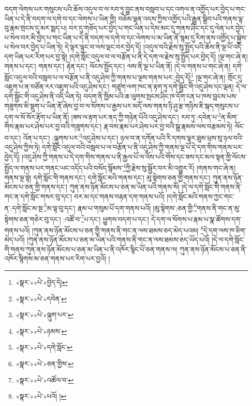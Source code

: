 བདག་ལེགས་པར་གསུངས་པའི་ཆོས་འདུལ་བ་ལ་རབ་ཏུ་བྱུང་ནས་བསླབ་པ་དང་འགལ་ན་འགྱོད་པར་བྱེད་པ་གང་ཡིན་པ་དེ་ནི་བདག་ལ་དགེ་བ་དང་ལེགས་པ་ཡིན་གྱི། བཅོམ་ལྡན་འདས་ཀྱིས་འགྱོད་པའི་རྒྱུན་སྒྲིབ་པའི་གནས་ལྟ་བུ་རྣམ་གྲངས་དུ་མར་སྨད་པ། བར་དུ་གཅོད་པར་བྱེད་པ་གང་ཡིན་པ་དེས་མང་དུ་གནས་ཤིང་དང་དུ་ལེན་པར་བྱེད་པ་སེལ་བར་མི་བྱེད་པ་གང་ཡིན་པ་དེ་ནི་བདག་ལ་དགེ་བ་དང་ལེགས་པ་མ་ཡིན་ནོ་སྙམ་དུ་རིག་ནས་འགྱོད་པ་སྐྱེས་པ་སེལ་བར་བྱེད་པ་ཡིན་ཏེ། དེ་ལྟར་ལྟུང་བ་ལས་ལྡང་བར་བྱེད་དོ། །འདུལ་བའི་རྗེས་སུ་སྤྱོད་པའི་ཆོས་ནི་ལྔ་པོ་འདི་དག་ཡིན་པར་རིག་པར་བྱ་སྟེ། །དགེ་སློང་འདུལ་བ་ལ་བརྩོན་པ་ནི་དེ་དག་ལ་རྗེས་སུ་སྤྱོད་པར་བྱེད་དོ། །ལྔ་གང་ཞེ་ན། གནས་པ་དང་། གནས་དང་། རྟེན་དང་། ལོངས་སྤྱོད་དང་། ལས་ནི་ལྔ་པ་ཡིན་ནོ། །དེ་ལ་གནས་པ་གང་ཞེ་ན། དགེ་སློང་འདུལ་བའི་བསླབ་པ་ལ་བརྩོན་པ་ནི་འདུ་ཤེས་ཀྱི་གནས་པ་ལྔས་གནས་པར་:བྱེད་དོ།\footnote{«སྣར་»«པེ་»བྱེད་དེ།} །ལྔ་གང་ཞེ་ན། གྲོང་དུ་འཇུག་པ་ན་བཙོན་རར་འཇུག་པའི་འདུ་ཤེས་དང་། གཙུག་ལག་ཁང་ན་རྟག་ཏུ་དགེ་སྦྱོང་གི་འདུ་ཤེས་དང་ལྡན། དེ་ལ་དགེ་སྦྱོང་གི་འདུ་ཤེས་ནི་འདི་ཡིན་ཏེ། བདག་ནི་ཁྱིམ་པའི་ཆ་ལུགས་སྤངས་ཤིང་ཁ་དོག་ངན་པ་ཁས་བླངས་པས་གཟུགས་མི་སྡུག་པ་ཡིན་ནོ་ཞེས་བྱ་བ་ལ་སོགས་པ་རྒྱས་པར་མདོ་ལས་གནས་ཉི་ཤུ་རྩ་གཉིས་ཇི་སྐད་གསུངས་པ་དག་ལ་སོ་སོར་རྟོག་པ་ཡིན་ནོ། །ཟས་ལ་རྟག་པར་ནད་ཀྱི་གཉེན་པོའི་འདུ་ཤེས་དང་། རབ་ཏུ་:དབེན་པ་\footnote{«སྣར་»«པེ་»དབེན་}ན་མིག་གིས་རྣམ་པར་ཤེས་པར་བྱ་བའི་གཟུགས་དང་། རྣ་བས་རྣམ་པར་ཤེས་པར་བྱ་བའི་སྒྲ་རྣམས་ལས་བརྩམས་ཏེ། ལོང་བ་དང་། འོན་པ་དང་། :ལྐུགས་པར་\footnote{«སྣར་»«པེ་»ལྐུག་པར་}འདུ་ཤེས་པ་དང་། ཉལ་བ་ན་དགོན་པའི་རི་དགས་ལྟར་ཐུམ་ཕྲས་སུ་ཉལ་བའི་འདུ་ཤེས་ཀྱིས་ཏེ། དགེ་སློང་འདུལ་བའི་བསླབ་པ་ལ་བརྩོན་པ་ནི་འདུ་ཤེས་ཀྱི་གནས་ལྔ་པོ་དེ་དག་གིས་གནས་པར་བྱེད་དོ། །འདུ་ཤེས་ཀྱི་གནས་པ་དེ་དག་གིས་གནས་པ་ནི་རྒྱལ་པོ་ལ་འོས་པའི་གོས་དང་ཟས་དང་མལ་སྟན་གྱི་ལོངས་སྤྱོད་ལ་གནས་པར་གནང་ཡང་འདོད་པའི་བསོད་སྙོམས་\footnote{«སྣར་»«པེ་»ཉམས་}ཀྱི་རྗེས་སུ་སྦྱོར་བར་མི་འགྱུར་རོ། །གནས་གང་ཞེ་ན། གནས་ལྔ་སྟེ། དགེ་སློང་གི་གནས་དང་། དགེ་སློང་མའི་གནས་དང་། མུ་སྟེགས་ཅན་གྱི་གནས་དང་། ཀུན་ནས་ཉོན་མོངས་པ་ཅན་གྱི་གནས་དང་། ཀུན་ནས་ཉོན་མོངས་པ་ཅན་མ་ཡིན་པའི་གནས་སོ། །དེ་ལ་དགེ་སློང་གི་གནས་ནི་གང་ན་དགེ་སློང་གསར་བུ་དང་། བར་མ་དང་གནས་བརྟན་དག་གནས་པའོ། །དགེ་སློང་མའི་གནས་ཀྱང་གང་ན་:དགེ་སློང་མ་སྔ་\footnote{«སྣར་»«པེ་»དགེ་སློང་}མ་ལྟ་བུ་དང་། རྣམ་པ་གསུམ་པོ་དག་གནས་པའོ། །མུ་སྟེགས་:ཅན་གྱི་\footnote{«སྣར་»«པེ་»ཅན་གྱིས་}གནས་ནི་གང་ན་མུ་སྟེགས་ཅན་གཅེར་བུ་དང་། :འཚོ་བ་\footnote{«སྣར་»«པེ་»འཚོལ་བ་}པ་དང་། ཕྱུགས་བདག་པ་དང་། དེ་དག་ལ་སོགས་པ་རྣམ་པ་སྣ་ཚོགས་དག་གནས་པའོ། །ཀུན་ནས་ཉོན་མོངས་པ་ཅན་གྱི་གནས་ནི་གང་ན་ལས་ཐམས་ཅད་མེད་པའམ། \footnote{«སྣར་»«པེ་»པའོ། ། }དེ་དག་ལས་ཁ་ཅིག་མེད་པའོ། །ཀུན་ནས་ཉོན་མོངས་པ་ཅན་མ་ཡིན་པའི་གནས་ནི་གང་ན་ལས་ཐམས་ཅད་ཡོད་པའོ། །དེ་ལ་དགེ་སློང་གི་གནས་ཀུན་ནས་ཉོན་མོངས་པ་ཅན་མ་ཡིན་པ་ནི་འཁོར་སྙིང་པོ་ཅན་གནས་ལ། ཀུན་ནས་ཉོན་མོངས་པ་ཅན་ནི་འཁོར་སྙིགས་མ་ཅན་གནས་པར་རིག་པར་བྱའོ། །
